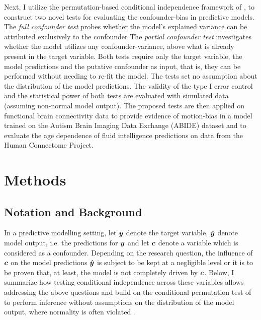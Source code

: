 \documentclass{article}
\begin{document}
Next, I utilize the permutation-based conditional independence framework of \cite{berrett2020conditional}, to construct two novel tests for evaluating the confounder-bias in predictive models.
The \emph{full confounder test} probes whether the model's explained variance can be attributed exclusively to the confounder
The \emph{partial confounder test} investigates whether the model utilizes any confounder-variance, above what is already present in the target variable.
Both tests require only the target variable, the model predictions and the putative confounder as input, that is, they can be performed without needing to re-fit the model.
The tests set no assumption about the distribution of the model predictions.
The validity of the type I error control and the statistical power of both tests are evaluated with simulated data (assuming non-normal model output).
The proposed tests are then applied on functional brain connectivity data to provide evidence of motion-bias in a model trained on the Autism Brain Imaging Data Exchange (ABIDE) dataset \citep{di2014autism} and to evaluate the age dependence of fluid intelligence predictions on data from the Human Connectome Project.

\section{Methods}

\subsection{Notation and Background}

In a predictive modelling setting, let $\boldsymbol{y}$ denote the target variable, $\boldsymbol{\hat{y}}$ denote model output, i.e. the predictions for $\boldsymbol{y}$ and let $\boldsymbol{c}$ denote a variable which is considered as a confounder. Depending on the research question, the influence of $\boldsymbol{c}$ on the model predictions $\boldsymbol{\hat{y}}$ is subject to be kept at a negligible level or it is to be proven that, at least, the model is not completely driven by $\boldsymbol{c}$. Below, I summarize how testing conditional independence \citep{dawid1979conditional} across these variables allows addressing the above questions and build on the conditional permutation test of \cite{berrett2020conditional} to perform inference without assumptions on the distribution of the model output, where normality is often violated \citep{garcia2009study, kristensen2017whole}.
\end{document}
